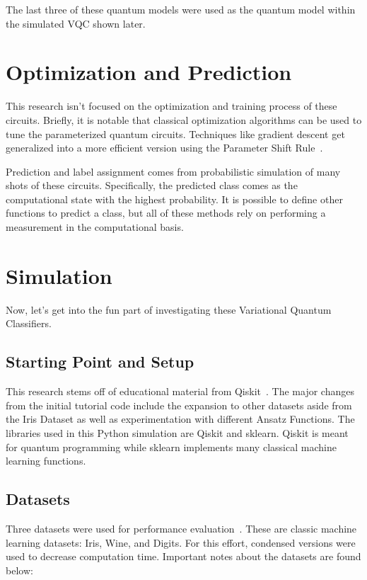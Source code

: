 \documentclass[11pt]{article}
\begin{document}
The last three of these quantum models were used as the quantum model within the simulated VQC shown later. 

\section{Optimization and Prediction}\label{train}

This research isn't focused on the optimization and training process of these circuits. Briefly, it is notable that classical optimization algorithms can be used to tune the
parameterized quantum circuits. Techniques like gradient descent get generalized into a more efficient version using the Parameter Shift Rule~\cite{crooks2019gradients}.

Prediction and label assignment comes from probabilistic simulation of many shots of these circuits. Specifically, the predicted class comes as the computational state with
the highest probability. It is possible to define other functions to predict a class, but all of these methods rely on performing a measurement in the computational basis.

\section{Simulation}\label{sim}

Now, let's get into the fun part of investigating these Variational Quantum Classifiers.

\subsection*{Starting Point and Setup}

This research stems off of educational material from Qiskit~\cite{qiskit_sim}. The major changes from the initial tutorial code include the expansion to other datasets aside 
from the Iris Dataset as well as experimentation with different Ansatz Functions. The libraries used in this Python simulation are Qiskit and sklearn. 
Qiskit is meant for quantum programming while sklearn implements many classical
machine learning functions.

\subsection*{Datasets}

Three datasets were used for performance evaluation~\cite{sklearndata}. These are classic machine learning datasets: Iris, Wine, and Digits. For this effort, condensed versions were used to decrease 
computation time. Important notes about the datasets are found below:
\end{document}
